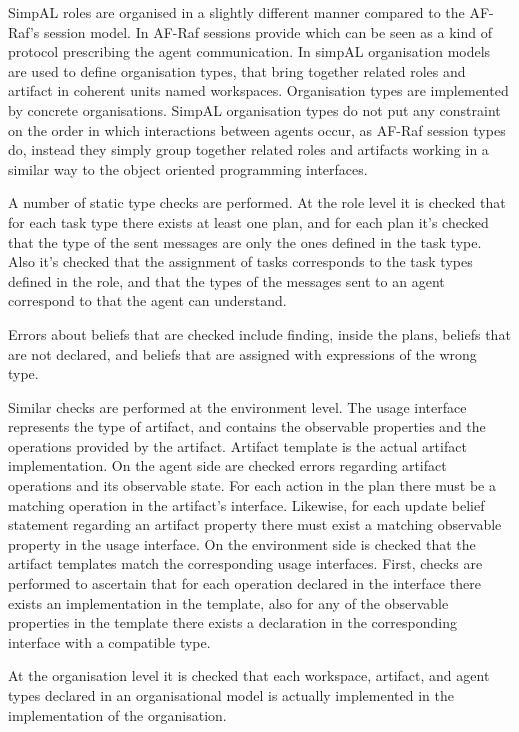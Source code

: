 \documentclass[a4paper,12pt,oneside,fleqn]{book} %
\begin{document}
SimpAL roles are organised in a slightly different manner compared to the
AF-Raf's session model. In AF-Raf sessions provide  which can be seen as a kind of protocol
prescribing the agent communication. In simpAL organisation models are used
to define organisation types, that bring together related roles and
artifact in coherent units named workspaces. Organisation types are
implemented by concrete organisations. SimpAL organisation types do not put
any constraint on the order in which interactions between agents occur, as
AF-Raf session types do, instead they simply group together related roles
and artifacts working in a similar way to the object oriented programming
interfaces.

A number of static type checks are performed. At the role level it is
checked that for each task type there exists at least one plan, and for
each plan it's checked that the type of the sent messages are only the ones
defined in the task type. Also it's checked that the assignment of tasks
corresponds to the task types defined in the role, and that the types of
the messages sent to an agent correspond to that the agent can understand.

Errors about beliefs that are checked include finding, inside the plans,
beliefs that are not declared, and beliefs that are assigned with
expressions of the wrong type.

Similar checks are performed at the environment level. The usage interface
represents the type of artifact, and contains the observable properties and
the operations provided by the artifact. Artifact template is the actual
artifact implementation. On the agent side are checked errors regarding
artifact operations and its observable state. For each action in the plan
there must be a matching operation in the artifact's interface.  Likewise,
for each update belief statement regarding an artifact property there must
exist a matching observable property in the usage interface. On the
environment side is checked that the artifact templates match the
corresponding usage interfaces. First, checks are performed to ascertain
that for each operation declared in the interface there exists an
implementation in the template, also for any of the observable properties
in the template there exists a declaration in the corresponding interface
with a compatible type.

At the organisation level it is checked that each workspace, artifact, and
agent types declared in an organisational model is actually implemented in
the implementation of the organisation.
\end{document}
